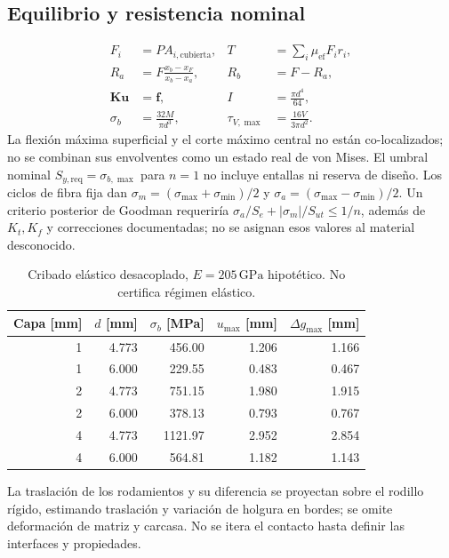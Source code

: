 \subsection{Equilibrio y resistencia nominal}
\begin{align}
F_i&=P A_{i,\mathrm{cubierta}},&T&=\sum_i\mu_{\mathrm{ef}}F_i r_i,\\
R_a&=F\frac{x_b-x_F}{x_b-x_a},&R_b&=F-R_a,\\
\mathbf K\mathbf u&=\mathbf f,&I&=\frac{\pi d^4}{64},\\
\sigma_b&=\frac{32M}{\pi d^3},&\tau_{V,\max}&=\frac{16V}{3\pi d^2}.
\end{align}
La flexión máxima superficial y el corte máximo central no están co-localizados;
no se combinan sus envolventes como un estado real de von Mises.
El umbral nominal $S_{y,\mathrm{req}}=\sigma_{b,\max}$ para $n=1$ no incluye entallas ni reserva de diseño.
Los ciclos de fibra fija dan $\sigma_m=(\sigma_{\max}+\sigma_{\min})/2$ y
$\sigma_a=(\sigma_{\max}-\sigma_{\min})/2$. Un criterio posterior de Goodman requeriría
$\sigma_a/S_e+|\sigma_m|/S_{ut}\leq1/n$, además de $K_t,K_f$ y correcciones documentadas;
no se asignan esos valores al material desconocido.
\begin{table}[ht]\centering\begin{tabular}{rrrrr}\toprule
Capa [mm]&$d$ [mm]&$\sigma_b$ [MPa]&$u_{\max}$ [mm]&$\Delta g_{\max}$ [mm]\\\midrule
1 & 4.773 & 456.00 & 1.206 & 1.166\\
1 & 6.000 & 229.55 & 0.483 & 0.467\\
2 & 4.773 & 751.15 & 1.980 & 1.915\\
2 & 6.000 & 378.13 & 0.793 & 0.767\\
4 & 4.773 & 1121.97 & 2.952 & 2.854\\
4 & 6.000 & 564.81 & 1.182 & 1.143\\
\bottomrule\end{tabular}
\caption{Cribado elástico desacoplado, $E=205\,\mathrm{GPa}$ hipotético. No certifica régimen elástico.}
\end{table}
La traslación de los rodamientos y su diferencia se proyectan sobre el rodillo rígido,
estimando traslación y variación de holgura en bordes; se omite deformación de matriz y carcasa.
No se itera el contacto hasta definir las interfaces y propiedades.
